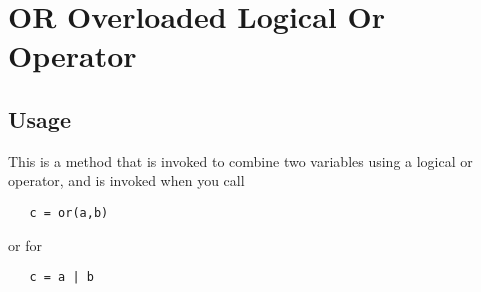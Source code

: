 \section{OR Overloaded Logical Or Operator}

\subsection{Usage}

This is a method that is invoked to combine two variables using a
logical or operator, and is invoked when you call
\begin{verbatim}
   c = or(a,b)
\end{verbatim}
or for 
\begin{verbatim}
   c = a | b
\end{verbatim}
